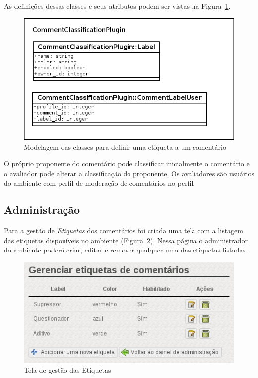 \documentclass[11pt]{article}
\begin{document}
As definições dessas classes e seus atributos podem ser vistas na
Figura~\ref{fig:labels-model}.

\begin{figure}[h]
\center
\includegraphics[scale=0.5]{labels-model.png}
\caption{Modelagem das classes para definir uma etiqueta a um comentário}
\label{fig:labels-model}
\end{figure}

O próprio proponente do comentário pode classificar inicialmente o
comentário e o avaliador pode alterar a classificação do proponente. Os
avaliadores são usuários do ambiente com perfil de moderação de
comentários no perfil.

\subsection{Administração}

Para a gestão de {\it Etiquetas} dos comentários foi criada uma tela com
a listagem das etiquetas disponíveis no ambiente
(Figura~\ref{fig:plugin-label-admin}). Nessa página o administrador
do ambiente poderá criar, editar e remover qualquer uma das etiquetas
listadas.

\begin{figure}[h]
\center
\includegraphics[scale=0.5]{plugin-label-admin.png}
\caption{Tela de gestão das Etiquetas}
\label{fig:plugin-label-admin}
\end{figure}
\end{document}

